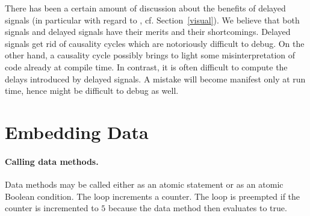 {There has been a certain amount of discussion about the benefits of 
delayed signals (in particular with regard to 
\statecharts, cf. 
Section~\ref{visual}). We believe that both signals and delayed 
signals have their merits and their shortcomings. Delayed signals get 
rid of causality cycles which are notoriously difficult to debug. On 
the other hand, a causality cycle possibly brings to light some 
misinterpretation of code already at compile time. In contrast, it is 
often difficult to compute the delays introduced by delayed signals. 
A mistake will become manifest only at run time, hence might be 
difficult to debug as well.
}


%


\section{Embedding Data}\label{Data}

\paragraph{Calling data methods.} Data methods
may be called either 
as an atomic statement or as an atomic Boolean condition.
%
% 
The loop increments a counter.  The loop is preempted if the counter 
is incremented to $5$ because the data method  then 
evaluates to true.

